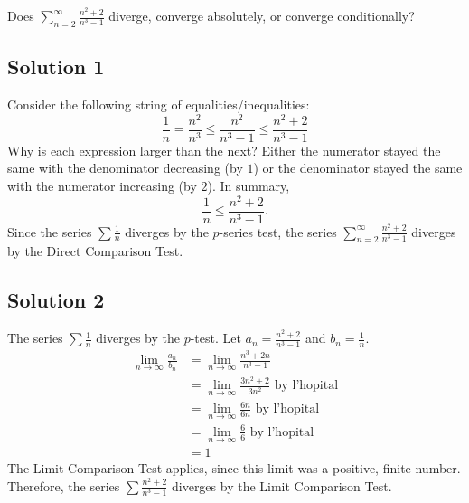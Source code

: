 \documentclass{article}
\begin{document}
\noindent
Does $\displaystyle \sum_{n=2}^\infty \frac{n^2+2}{n^3-1}$
diverge, converge absolutely, or converge conditionally?

\subsection*{Solution 1}

Consider the following string of equalities/inequalities:
\[ \frac1n = \frac{n^2}{n^3} \leq \frac{n^2}{n^3-1} \leq \frac{n^2+2}{n^3-1}\]
Why is each expression larger than the next? Either the numerator stayed the same with the denominator decreasing (by $1$) or the denominator stayed the same with the numerator increasing (by $2$). In summary,
\[ \frac1n \leq \frac{n^2+2}{n^3-1}.\]
Since the series $\sum \frac1n$ diverges by the $p$-series test, the series $\displaystyle \sum_{n=2}^\infty \frac{n^2+2}{n^3-1}$ diverges by the Direct Comparison Test.


\subsection*{Solution 2}

The series $\sum \frac1{n}$ diverges by the $p$-test. Let $a_n = \frac{n^2+2}{n^3-1}$ and $b_n = \frac1{n}$.
\begin{align*}
\lim_{n \to \infty} \frac{a_n}{b_n}
&= \lim_{n \to \infty} \frac{n^3+2n}{n^3-1}\\
&= \lim_{n \to \infty} \frac{3n^2+2}{3n^2} \text{ by l'hopital}\\
&= \lim_{n \to \infty} \frac{6n}{6n} \text{ by l'hopital}\\
&= \lim_{n \to \infty} \frac66 \text{ by l'hopital}\\
&= 1
\end{align*}
The Limit Comparison Test applies, since this limit was a positive, finite number. Therefore, the series $\sum \frac{n^2+2}{n^3-1}$ diverges by the Limit Comparison Test.
\end{document}

